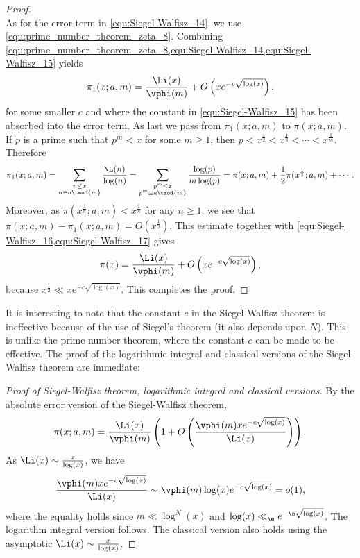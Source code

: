 \begin{proof}
\begin{equation}
      \end{equation}
      As for the error term in \cref{equ:Siegel-Walfisz_14}, we use \cref{equ:prime_number_theorem_zeta_8}. Combining \cref{equ:prime_number_theorem_zeta_8,equ:Siegel-Walfisz_14,equ:Siegel-Walfisz_15} yields
      \begin{equation}\label{equ:Siegel-Walfisz_16}
        \pi_{1}(x;a,m) = \frac{\Li(x)}{\vphi(m)}+O\left(xe^{-c\sqrt{\log(x)}}\right),
      \end{equation}
      for some smaller $c$ and where the constant in \cref{equ:Siegel-Walfisz_15} has been absorbed into the error term. As last we pass from $\pi_{1}(x;a,m)$ to $\pi(x;a,m)$. If $p$ is a prime such that $p^{m} < x$ for some $m \ge 1$, then $p < x^{\frac{1}{2}} < x^{\frac{1}{3}} < \cdots < x^{\frac{1}{m}}$. Therefore
      \begin{equation}\label{equ:Siegel-Walfisz_17}
        \pi_{1}(x;a,m) = \sum_{\substack{n \le x \\ n \equiv a \tmod{m}}}\frac{\L(n)}{\log(n)} = \sum_{\substack{p^{m} \le x \\ p^{m} \equiv a \tmod{m}}}\frac{\log(p)}{m\log(p)} = \pi(x;a,m)+\frac{1}{2}\pi(x^{\frac{1}{2}};a,m)+\cdots.
      \end{equation}
      Moreover, as $\pi(x^{\frac{1}{n}};a,m) < x^{\frac{1}{n}}$ for any $n \ge 1$, we see that $\pi(x;a,m)-\pi_{1}(x;a,m) = O(x^{\frac{1}{2}})$. This estimate together with \cref{equ:Siegel-Walfisz_16,equ:Siegel-Walfisz_17} gives
      \[
        \pi(x) = \frac{\Li(x)}{\vphi(m)}+O\left(xe^{-c\sqrt{\log(x)}}\right),
      \]
      because $x^{\frac{1}{2}} \ll xe^{-c\sqrt{\log(x)}}$. This completes the proof.
    \end{proof}

    It is interesting to note that the constant $c$ in the Siegel-Walfisz theorem is ineffective because of the use of Siegel's theorem (it also depends upon $N$). This is unlike the prime number theorem, where the constant $c$ can be made to be effective. The proof of the logarithmic integral and classical versions of the Siegel-Walfisz theorem are immediate:

    \begin{proof}[Proof of Siegel-Walfisz theorem, logarithmic integral and classical versions]
      By the absolute error version of the Siegel-Walfisz theorem,
      \[
        \pi(x;a,m) = \frac{\Li(x)}{\vphi(m)}\left(1+O\left(\frac{\vphi(m)xe^{-c\sqrt{\log(x)}}}{\Li(x)}\right)\right).
      \]
      As $\Li(x) \sim \frac{x}{\log(x)}$, we have
      \[
        \frac{\vphi(m)xe^{-c\sqrt{\log(x)}}}{\Li(x)} \sim \vphi(m)\log(x)e^{-c\sqrt{\log(x)}} = o(1),
      \]
      where the equality holds since $m \ll \log^{N}(x)$ and $\log(x) \ll_{\e} e^{-\e\sqrt{\log(x)}}$. The logarithm integral version follows. The classical version also holds using the asymptotic $\Li(x) \sim \frac{x}{\log(x)}$.
    \end{proof}
    
